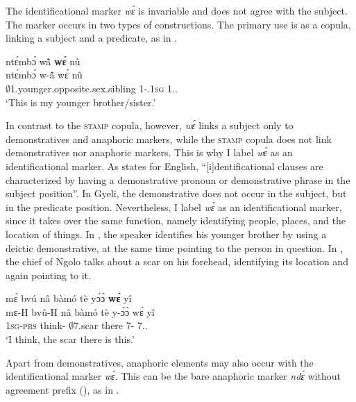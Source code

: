 The identificational marker {\itshape wɛ́} is invariable and does not agree with the subject. The marker occurs in two types of constructions. The primary use is as a copula, linking a subject and a predicate, as in .

\ea\label{we1}
\ea\label{we1a}
  \glll ntɛ́mbɔ́ wã̂ {\bfseries wɛ́} nû \\
        ntɛ́mbɔ́ w-ã̂ wɛ́ nû  \\
          $\emptyset$1.younger.opposite.sex.sibling 1-{\POSS}.1\textsc{sg} {\ID} 1.{\DEM}.{\PROX}  \\
    \trans `This is my younger brother/sister.'
\z
\z

In contrast to the \textsc{stamp} copula, however, {\itshape wɛ́} links a subject only to demonstratives and anaphoric markers, while the \textsc{stamp} copula does not link demonstratives nor anaphoric markers. This is why I label {\itshape wɛ́} as an identificational marker.
As \citet[1812]{mikkelsen2011} states for English, ``[i]dentificational clauses are characterized by having a demonstrative pronoun or demonstrative phrase in the subject position''.  In Gyeli, the demonstrative does not occur in the subject, but in the predicate position. Nevertheless, I label {\itshape wɛ́} as an identificational marker, since it takes over the same function, namely identifying people, places, and the location of things. In , the speaker identifies his younger brother by using a deictic demonstrative, at the same time pointing to the person in question. In , the chief of Ngolo talks about a scar on his forehead, identifying its location and again pointing to it.


\ea \label{we2}
  \glll     mɛ́ bvú nâ bàmó tè yɔ́ɔ̀ {\bfseries wɛ́} yî \\
          mɛ-H bvû-H nâ bàmó tè y-ɔ́ɔ̀ wɛ́ yî \\
              1\textsc{sg}-\textsc{prs} think-{\R} {\COMP} $\emptyset$7.scar there 7-{\OBJ} {\ID} 7.{\DEM}.{\PROX} \\
    \trans `I think, the scar there is this.'
\z

Apart from demonstratives, anaphoric elements may also occur with the identificational marker {\itshape wɛ́}. This can be the bare anaphoric marker {\itshape ndɛ́} without agreement prefix (), as in .

